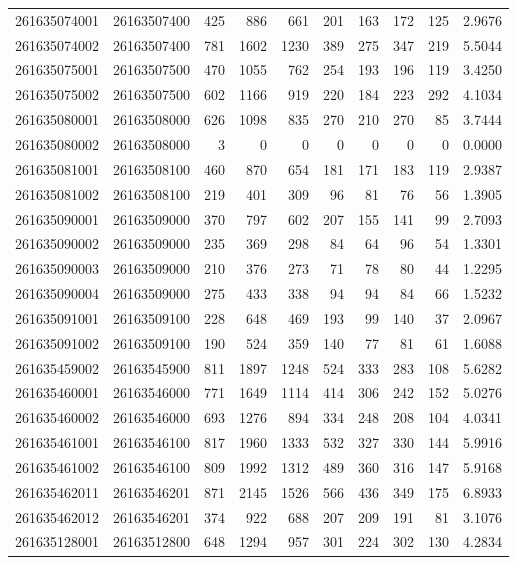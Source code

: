 \documentclass[
  11pt,
]{article}
\begin{document}
\begin{longtable}[t]{llrrrrrrrr}
261635074001 & 26163507400 & 425 & 886 & 661 & 201 & 163 & 172 & 125 & 2.9676\\
261635074002 & 26163507400 & 781 & 1602 & 1230 & 389 & 275 & 347 & 219 & 5.5044\\
261635075001 & 26163507500 & 470 & 1055 & 762 & 254 & 193 & 196 & 119 & 3.4250\\
261635075002 & 26163507500 & 602 & 1166 & 919 & 220 & 184 & 223 & 292 & 4.1034\\
261635080001 & 26163508000 & 626 & 1098 & 835 & 270 & 210 & 270 & 85 & 3.7444\\
261635080002 & 26163508000 & 3 & 0 & 0 & 0 & 0 & 0 & 0 & 0.0000\\
261635081001 & 26163508100 & 460 & 870 & 654 & 181 & 171 & 183 & 119 & 2.9387\\
261635081002 & 26163508100 & 219 & 401 & 309 & 96 & 81 & 76 & 56 & 1.3905\\
261635090001 & 26163509000 & 370 & 797 & 602 & 207 & 155 & 141 & 99 & 2.7093\\
261635090002 & 26163509000 & 235 & 369 & 298 & 84 & 64 & 96 & 54 & 1.3301\\
261635090003 & 26163509000 & 210 & 376 & 273 & 71 & 78 & 80 & 44 & 1.2295\\
261635090004 & 26163509000 & 275 & 433 & 338 & 94 & 94 & 84 & 66 & 1.5232\\
261635091001 & 26163509100 & 228 & 648 & 469 & 193 & 99 & 140 & 37 & 2.0967\\
261635091002 & 26163509100 & 190 & 524 & 359 & 140 & 77 & 81 & 61 & 1.6088\\
261635459002 & 26163545900 & 811 & 1897 & 1248 & 524 & 333 & 283 & 108 & 5.6282\\
261635460001 & 26163546000 & 771 & 1649 & 1114 & 414 & 306 & 242 & 152 & 5.0276\\
261635460002 & 26163546000 & 693 & 1276 & 894 & 334 & 248 & 208 & 104 & 4.0341\\
261635461001 & 26163546100 & 817 & 1960 & 1333 & 532 & 327 & 330 & 144 & 5.9916\\
261635461002 & 26163546100 & 809 & 1992 & 1312 & 489 & 360 & 316 & 147 & 5.9168\\
261635462011 & 26163546201 & 871 & 2145 & 1526 & 566 & 436 & 349 & 175 & 6.8933\\
261635462012 & 26163546201 & 374 & 922 & 688 & 207 & 209 & 191 & 81 & 3.1076\\
261635128001 & 26163512800 & 648 & 1294 & 957 & 301 & 224 & 302 & 130 & 4.2834\\

\end{longtable}
\end{document}
